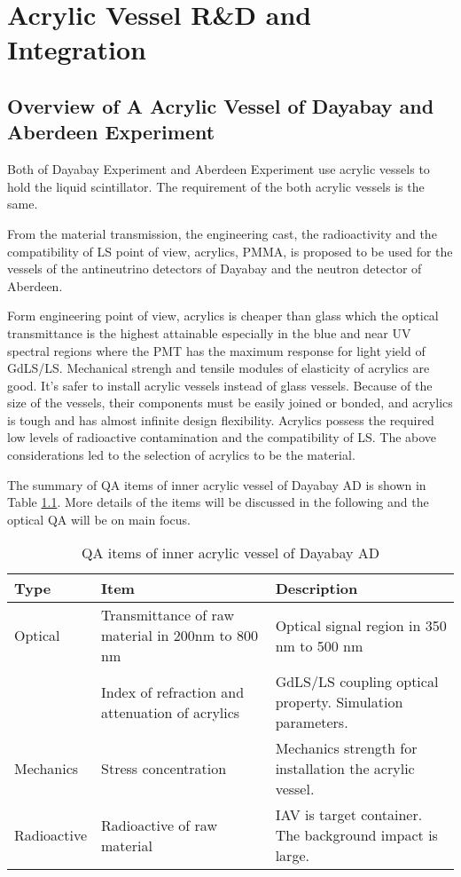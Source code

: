 \chapter {Acrylic Vessel R\&D and Integration}
\label{chap:arylicVessel}
\section {Overview of A Acrylic Vessel of Dayabay and Aberdeen Experiment}

Both of Dayabay Experiment and Aberdeen Experiment use acrylic vessels to hold
the liquid scintillator. The requirement of the both acrylic vessels is the same.

From the material transmission, the engineering cast, the radioactivity and the compatibility of LS point of view,
acrylics, PMMA, is proposed to be used for the vessels of the antineutrino detectors of Dayabay and the neutron detector of Aberdeen.

Form engineering point of view, acrylics is cheaper than glass which the optical transmittance is the highest attainable
especially in the blue and near UV spectral regions where the PMT has the maximum response for light yield of GdLS/LS.
Mechanical strengh and tensile modules of elasticity of acrylics are good.
It's safer to install acrylic vessels instead of glass vessels.
Because of the size of the vessels, their components must be easily joined or bonded, and acrylics
is tough and has almost infinite design flexibility.\cite{acrylic:handbook}
Acrylics possess the required low levels of radioactive contamination and the compatibility of LS.
The above considerations led to the selection of acrylics to be the material.

The summary of QA items of inner acrylic vessel of Dayabay AD is shown in
Table \ref{tab:IAVQA}. More details of the items will be discussed in the following and
the optical QA will be on main focus.
\begin{table}
\centering
\caption{QA items of inner acrylic vessel of Dayabay AD}
\label{tab:IAVQA}
\begin{tabular}{lp{5.0cm}p{5.0cm}}
\hline
Type & Item & Description \\
\hline
\hline
Optical & Transmittance of raw material in 200nm to 800 nm & Optical signal region in 350 nm to 500 nm \\
        & Index of refraction and attenuation of acrylics & GdLS/LS coupling optical property. Simulation parameters.\\
Mechanics & Stress concentration & Mechanics strength for installation the acrylic vessel. \\
Radioactive & Radioactive of raw material & IAV is target container. The background impact is large.\\
\hline
\end{tabular}
\end{table}




